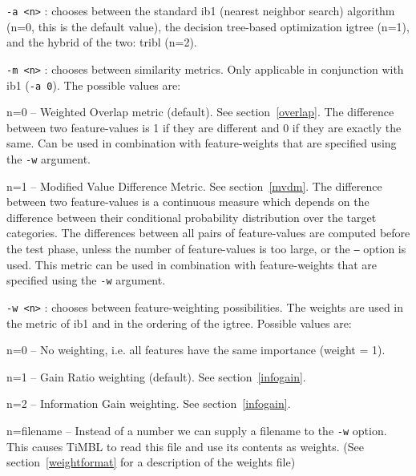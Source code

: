 \documentclass{report}
\begin{document}
\begin{description}

\item {\tt -a <n>} : chooses between the standard {\sc ib1} (nearest
neighbor search) algorithm (n=0, this is the default value), the
decision tree-based optimization {\sc igtree} (n=1), and the hybrid of
the two: {\sc tribl} (n=2).

\item {\tt -m <n>} : chooses between similarity metrics. Only
applicable in conjunction with {\sc ib1} ({\tt -a 0}). The possible values
are:

	\begin{description}

	\item n=0 -- Weighted Overlap metric (default). See
	section~\ref{overlap}. The difference between two
	feature-values is 1 if they are different and 0 if they are
	exactly the same. Can be used in combination with
	feature-weights that are specified using the {\tt -w}
	argument.

	\item n=1 -- Modified Value Difference Metric. See
	section~\ref{mvdm}. The difference between two feature-values
	is a continuous measure which depends on the difference
	between their conditional probability distribution over the
	target categories. The differences between all pairs of
	feature-values are computed before the test phase, unless the
	number of feature-values is too large, or the {\tt --} option
	is used. This metric can be used in combination with
	feature-weights that are specified using the {\tt -w} argument.

	\end{description}

\item {\tt -w <n>} : chooses between feature-weighting possibilities.
The weights are used in the metric of {\sc ib1} and in the ordering of the
{\sc igtree}. Possible values are:

	\begin{description}
	\item n=0 -- No weighting, i.e. all features have the same
	importance (weight = 1).
	\item n=1 -- Gain Ratio weighting (default). See section~\ref{infogain}.
	\item n=2 -- Information Gain weighting. See section~\ref{infogain}.
	\item n=filename -- Instead of a number we can supply a
	filename to the {\tt -w} option. This causes TiMBL to read this file
	and use its contents as weights. (See section~\ref{weightformat} for a
	description of the weights file)
	\end{description}


\end{description}
\end{document}
